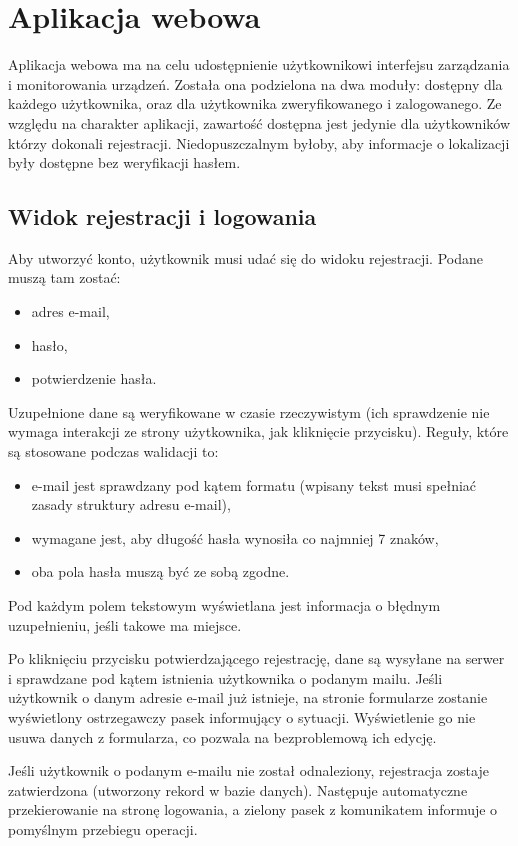 \documentclass[eng,printmode]{mgr}
\begin{document}
\section{Aplikacja webowa}
Aplikacja webowa ma na celu udostępnienie użytkownikowi interfejsu zarządzania i monitorowania urządzeń.
Została ona podzielona na dwa moduły: dostępny dla każdego użytkownika, oraz dla użytkownika zweryfikowanego i zalogowanego. Ze względu na charakter aplikacji, zawartość dostępna jest jedynie dla użytkowników którzy dokonali rejestracji. Niedopuszczalnym byłoby, aby informacje o lokalizacji były dostępne bez weryfikacji hasłem.

\subsection{Widok rejestracji i logowania}
Aby utworzyć konto, użytkownik musi udać się do widoku rejestracji. Podane muszą tam zostać:
\begin{itemize}
\item adres e-mail,
\item hasło,
\item potwierdzenie hasła.
\end{itemize}

Uzupełnione dane są weryfikowane w czasie rzeczywistym (ich sprawdzenie nie wymaga interakcji ze strony użytkownika, jak kliknięcie przycisku). Reguły, które są stosowane podczas walidacji to:
\begin{itemize}
\item e-mail jest sprawdzany pod kątem formatu (wpisany tekst musi spełniać zasady struktury adresu e-mail),
\item wymagane jest, aby długość hasła wynosiła co najmniej 7 znaków,
\item oba pola hasła muszą być ze sobą zgodne.
\end{itemize}
Pod każdym polem tekstowym wyświetlana jest informacja o błędnym uzupełnieniu, jeśli takowe ma miejsce.

Po kliknięciu przycisku potwierdzającego rejestrację, dane są wysyłane na serwer i sprawdzane pod kątem istnienia użytkownika o podanym mailu. Jeśli użytkownik o danym adresie e-mail już istnieje, na stronie formularze zostanie wyświetlony ostrzegawczy pasek informujący o sytuacji. Wyświetlenie go nie usuwa danych z formularza, co pozwala na bezproblemową ich edycję.

Jeśli użytkownik o podanym e-mailu nie został odnaleziony, rejestracja zostaje zatwierdzona (utworzony rekord w bazie danych). Następuje automatyczne przekierowanie na stronę logowania, a zielony pasek z komunikatem informuje o pomyślnym przebiegu operacji.
\end{document}

